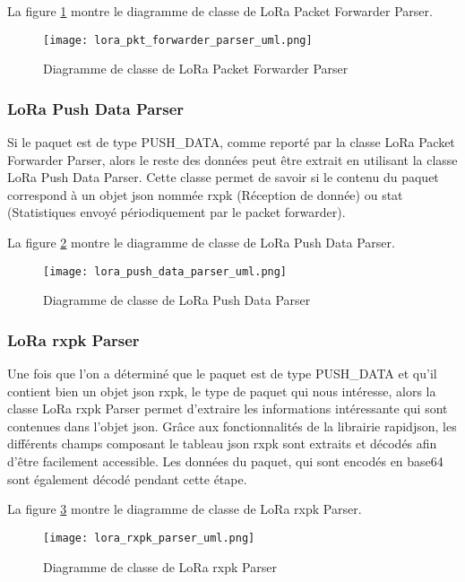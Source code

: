 La figure \ref{fig:lora_pkt_forwarder_parser_uml} montre le diagramme de classe de LoRa Packet Forwarder Parser.

\begin{figure}[htb]
\centering 
\texttt{[image: lora\_pkt\_forwarder\_parser\_uml.png]} 
\caption{Diagramme de classe de LoRa Packet Forwarder Parser}
\label{fig:lora_pkt_forwarder_parser_uml}
 \end{figure}

\subsubsection{LoRa Push Data Parser}

Si le paquet est de type PUSH\_DATA, comme reporté par la classe LoRa Packet Forwarder Parser, alors le reste des données peut être extrait en utilisant la classe LoRa Push Data Parser. Cette classe permet de savoir si le contenu du paquet correspond à un objet json nommée rxpk (Réception de donnée) ou stat (Statistiques envoyé périodiquement par le packet forwarder).

La figure \ref{fig:lora_push_data_parser_uml} montre le diagramme de classe de LoRa Push Data Parser.

\begin{figure}[htb]
\centering 
\texttt{[image: lora\_push\_data\_parser\_uml.png]} 
\caption{Diagramme de classe de LoRa Push Data Parser}
\label{fig:lora_push_data_parser_uml}
 \end{figure}

\subsubsection{LoRa rxpk Parser}

Une fois que l'on a déterminé que le paquet est de type PUSH\_DATA et qu'il contient bien un objet json rxpk, le type de paquet qui nous intéresse, alors la classe LoRa rxpk Parser permet d'extraire les informations intéressante qui sont contenues dans l'objet json. Grâce aux fonctionnalités de la librairie rapidjson, les différents champs composant le tableau json rxpk sont extraits et décodés afin d'être facilement accessible. Les données du paquet, qui sont encodés en base64 sont également décodé pendant cette étape.

La figure \ref{fig:lora_rxpk_parser_uml} montre le diagramme de classe de LoRa rxpk Parser.

\begin{figure}[htb]
\centering 
\texttt{[image: lora\_rxpk\_parser\_uml.png]} 
\caption{Diagramme de classe de LoRa rxpk Parser}
\label{fig:lora_rxpk_parser_uml}
 \end{figure}

